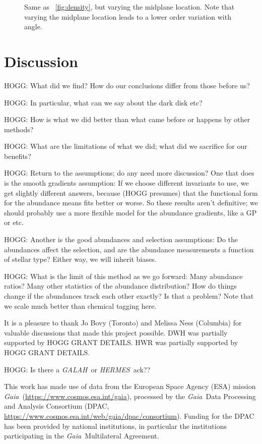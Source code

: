 \documentclass[modern]{aastex62}
\newcommand{\acronym}[1]{{\small{#1}}}
\newcommand{\project}[1]{\textsl{#1}}
\newcommand{\galah}{\project{\acronym{GALAH}}}
\newcommand{\gaia}{\project{Gaia}}
\newcommand{\hermes}{\project{\acronym{HERMES}}}
\begin{document}
\begin{figure}
\caption{Same as \figurename~\ref{fig:density}, but varying the midplane location. Note
that varying the midplane location leads to a lower order variation with angle.\label{fig:midplane}}
\end{figure}

\section{Discussion}

HOGG: What did we find? How do our conclusions differ from those before us?

HOGG: In particular, what can we say about the dark disk etc?

HOGG: How is what we did better than what came before or happens by other methods?

HOGG: What are the limitations of what we did; what did we sacrifice for our benefits?

HOGG: Return to the assumptions; do any need more discussion? One that does is the smooth
gradients assumption: If we choose different invariants to use, we get slightly different
answers, because (HOGG presumes) that the functional form for the abundance means fits
better or worse. So these results aren't definitive; we should probably use a more flexible
model for the abundance gradients, like a GP or etc.

HOGG: Another is the good abundances and selection assumptions: Do the abundances affect
the selection, and are the abundance measurements a function of stellar type? Either way,
we will inherit biases.

HOGG: What is the limit of this method as we go forward: Many abundance ratios? Many other
statistics of the abundance distribution? How do things change if the abundances track
each other exactly? Is that a problem? Note that we scale much better than chemical tagging
here.

\acknowledgements
It is a pleasure to thank
  Jo Bovy (Toronto)
  and
  Melissa Ness (Columbia)
for valuable discussions that made this project possible.
DWH was partially supported by HOGG GRANT DETAILS.
HWR was partially supported by HOGG GRANT DETAILS.

HOGG: Is there a \galah\ or \hermes\ ack??

This work has made use of data from the European Space Agency (\acronym{ESA}) mission
\gaia\ (\url{https://www.cosmos.esa.int/gaia}), processed by the \gaia\ Data
Processing and Analysis Consortium (\acronym{DPAC},
\url{https://www.cosmos.esa.int/web/gaia/dpac/consortium}). Funding for the
\acronym{DPAC}
has been provided by national institutions, in particular the institutions
participating in the \gaia\ Multilateral Agreement.
\end{document}
